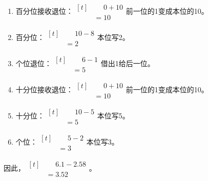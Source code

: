 {\begin{enumerate}[leftmargin=1.7em,itemsep=5pt,topsep=0pt]
\item 百分位接收退位：\(\begin{aligned}[t]&\phantom{={}}0+10\\&=10\end{aligned}\)\quad 前一位的1变成本位的10。
\item 百分位：\(\begin{aligned}[t]&\phantom{={}}10-8\\&=2\end{aligned}\)\quad 本位写2。
\item 个位退位：\(\begin{aligned}[t]&\phantom{={}}6-1\\&=5\end{aligned}\)\quad 借出1给后一位。
\item 十分位接收退位：\(\begin{aligned}[t]&\phantom{={}}0+10\\&=10\end{aligned}\)\quad 前一位的1变成本位的10。
\item 十分位：\(\begin{aligned}[t]&\phantom{={}}10-5\\&=5\end{aligned}\)\quad 本位写5。
\item 个位：\(\begin{aligned}[t]&\phantom{={}}5-2\\&=3\end{aligned}\)\quad 本位写3。
\end{enumerate}
\par\smallskip
因此，\(\begin{aligned}[t]&\phantom{={}}6.1-2.58\\&=3.52\end{aligned}\)。
\par\medskip

}
